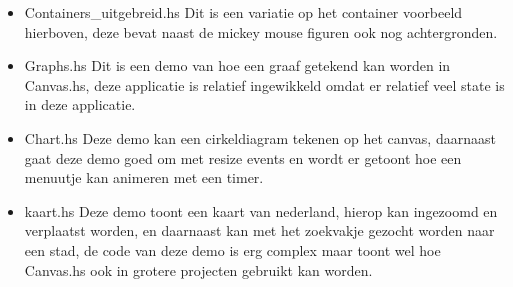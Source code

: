 \begin{itemize}
    \item Containers\_uitgebreid.hs
Dit is een variatie op het container voorbeeld hierboven, deze bevat naast de mickey mouse figuren ook nog achtergronden.
    \item Graphs.hs
Dit is een demo van hoe een graaf getekend kan worden in Canvas.hs, deze applicatie is relatief ingewikkeld omdat er relatief veel state is in deze applicatie.
    \item Chart.hs
Deze demo kan een cirkeldiagram tekenen op het canvas, daarnaast gaat deze demo goed om met resize events en wordt er getoont hoe een menuutje kan animeren met een timer.
    \item kaart.hs
Deze demo toont een kaart van nederland, hierop kan ingezoomd en verplaatst worden, en daarnaast kan met het zoekvakje gezocht worden naar een stad, de code van deze demo is erg complex maar toont wel hoe Canvas.hs ook in grotere projecten gebruikt kan worden.
\end{itemize}

